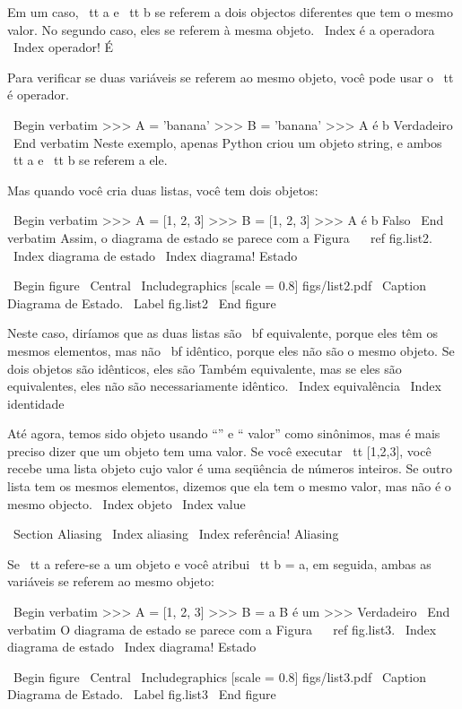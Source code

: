 \documentclass[10pt]{book}
\begin{document}
{{{{{{{Em um caso, {\ tt a} e {\ tt b} se referem a dois objectos diferentes que
tem o mesmo valor. No segundo caso, eles se referem à mesma
objeto.
\ Index {} é a operadora
\ Index {operador! É}

Para verificar se duas variáveis ​​se referem ao mesmo objeto, você pode
usar o {\ tt é} operador.

\ Begin {verbatim}
>>> A = 'banana'
>>> B = 'banana'
>>> A é b
Verdadeiro
\ End {verbatim}
%
Neste exemplo, apenas Python criou um objeto string,
e ambos {\ tt a} e {\ tt b} se referem a ele.

Mas quando você cria duas listas, você tem dois objetos:

\ Begin {verbatim}
>>> A = [1, 2, 3]
>>> B = [1, 2, 3]
>>> A é b
Falso
\ End {verbatim}
%
Assim, o diagrama de estado se parece com a Figura ~ \ ref {} fig.list2.
\ Index {diagrama de estado}
\ Index {diagrama! Estado}

\ Begin {figure}
\ Central
{\ Includegraphics [scale = 0.8] {figs/list2.pdf}}
\ Caption {Diagrama de Estado.}
\ Label {} fig.list2
\ End {figure}


Neste caso, diríamos que as duas listas são {\ bf equivalente},
porque eles têm os mesmos elementos, mas não {\ bf idêntico}, porque
eles não são o mesmo objeto. Se dois objetos são idênticos, eles são
Também equivalente, mas se eles são equivalentes, eles não são necessariamente
idêntico.
\ Index {equivalência}
\ Index {identidade}

Até agora, temos sido objeto usando ``'' e `` valor''
como sinônimos, mas é mais preciso dizer que um objeto tem uma
valor. Se você executar {\ tt [1,2,3]}, você recebe uma lista
objeto cujo valor é uma seqüência de números inteiros. Se outro
lista tem os mesmos elementos, dizemos que ela tem o mesmo valor, mas
não é o mesmo objecto.
\ Index {objeto}
\ Index {value}


\ Section {} Aliasing
\ Index {aliasing}
\ Index {referência! Aliasing}

Se {\ tt a} refere-se a um objeto e você atribui {\ tt b = a},
em seguida, ambas as variáveis ​​se referem ao mesmo objeto:

\ Begin {verbatim}
>>> A = [1, 2, 3]
>>> B = a
B é um >>>
Verdadeiro
\ End {verbatim}
%
O diagrama de estado se parece com a Figura ~ \ ref {} fig.list3.
\ Index {diagrama de estado}
\ Index {diagrama! Estado}

\ Begin {figure}
\ Central
{\ Includegraphics [scale = 0.8] {figs/list3.pdf}}
\ Caption {Diagrama de Estado.}
\ Label {} fig.list3
\ End {figure}

}}}}}}}
\end{document}
